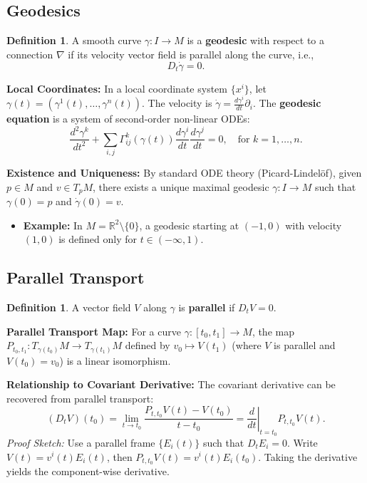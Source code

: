 \documentclass[11pt, a4paper]{article}
\theoremstyle{plain}
\theoremstyle{definition}
\newtheorem{definition}[theorem]{Definition}
\theoremstyle{remark}
\begin{document}
\subsection{Geodesics}

\begin{definition}
A smooth curve $\gamma: I \to M$ is a \textbf{geodesic} with respect to a connection $\nabla$ if its velocity vector field is parallel along the curve, i.e.,
\[ D_t \dot{\gamma} = 0. \]
\end{definition}

\textbf{Local Coordinates:} 
In a local coordinate system $\{x^i\}$, let $\gamma(t) = (\gamma^1(t), \dots, \gamma^n(t))$. The velocity is $\dot{\gamma} = \frac{d\gamma^i}{dt} \partial_i$. The \textbf{geodesic equation} is a system of second-order non-linear ODEs:
\[ \frac{d^2 \gamma^k}{dt^2} + \sum_{i,j} \Gamma_{ij}^k(\gamma(t)) \frac{d\gamma^i}{dt} \frac{d\gamma^j}{dt} = 0, \quad \text{for } k=1, \dots, n. \]

\textbf{Existence and Uniqueness:} 
By standard ODE theory (Picard-Lindelöf), given $p \in M$ and $v \in T_p M$, there exists a unique maximal geodesic $\gamma: I \to M$ such that $\gamma(0) = p$ and $\dot{\gamma}(0) = v$.
\begin{itemize}
    \item \textbf{Example:} In $M = \mathbb{R}^2 \setminus \{0\}$, a geodesic starting at $(-1,0)$ with velocity $(1,0)$ is defined only for $t \in (-\infty, 1)$.
\end{itemize}

\subsection{Parallel Transport}

\begin{definition}
A vector field $V$ along $\gamma$ is \textbf{parallel} if $D_t V = 0$.
\end{definition}

\textbf{Parallel Transport Map:} 
For a curve $\gamma: [t_0, t_1] \to M$, the map $P_{t_0, t_1}: T_{\gamma(t_0)}M \to T_{\gamma(t_1)}M$ defined by $v_0 \mapsto V(t_1)$ (where $V$ is parallel and $V(t_0)=v_0$) is a linear isomorphism.

\textbf{Relationship to Covariant Derivative:}
The covariant derivative can be recovered from parallel transport:
\[ (D_t V)(t_0) = \lim_{t \to t_0} \frac{P_{t, t_0} V(t) - V(t_0)}{t - t_0} = \left. \frac{d}{dt} \right|_{t=t_0} P_{t, t_0} V(t). \]
\textit{Proof Sketch:} Use a parallel frame $\{E_i(t)\}$ such that $D_t E_i = 0$. Write $V(t) = v^i(t) E_i(t)$, then $P_{t, t_0} V(t) = v^i(t) E_i(t_0)$. Taking the derivative yields the component-wise derivative.
\end{document}
